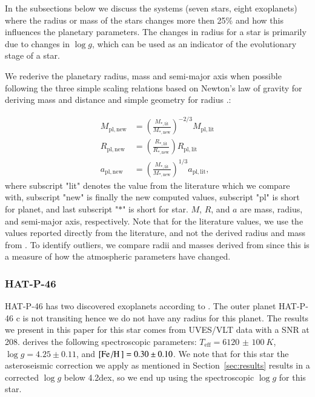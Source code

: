 \documentclass{aa}
\begin{document}
In the subsections below we discuss the systems (seven stars, eight exoplanets)
where the radius or mass of the stars changes more then 25\% and how this
influences the planetary parameters. The changes in radius for a star is
primarily due to changes in $\log g$, which can be used as an indicator of the
evolutionary stage of a star.

We rederive the planetary radius, mass and semi-major axis when possible
following the three simple scaling relations based on Newton's law of gravity
\citep{Newton1687} for deriving mass and distance and simple geometry for radius
\citep[see e.g.][]{Torres2008}.:

\begin{align}
    M_\mathrm{pl,new} &= \left(\frac{M_\mathrm{\ast,lit}}{M_\mathrm{\ast,new}}\right)^{-2/3} M_\mathrm{pl,lit}  \\
    R_\mathrm{pl,new} &= \left(\frac{R_\mathrm{\ast,lit}}{R_\mathrm{\ast,new}}\right) R_\mathrm{pl,lit} \\
    a_\mathrm{pl,new} &= \left(\frac{M_\mathrm{\ast,lit}}{M_\mathrm{\ast,new}}\right)^{1/3} a_\mathrm{pl,lit},
\end{align}
where subscript "lit" denotes the value from the literature which we compare
with, subscript "new" is finally the new computed values, subscript "pl" is
short for planet, and last subscript "$\ast$" is short for star. $M$, $R$, and
$a$ are mass, radius, and semi-major axis, respectively. Note that for the
literature values, we use the values reported directly from the literature, and
not the derived radius and mass from \citet{Torres2010}. To identify outliers,
we compare radii and masses derived from \citet{Torres2010} since this is a
measure of how the atmospheric parameters have changed.

\subsubsection{HAT-P-46}
\label{sub:HAT-P-46}
HAT-P-46 has two discovered exoplanets according to \citet{Hartmann2014}. The
outer planet HAT-P-46 c is not transiting hence we do not have any radius for
this planet. The results we present in this paper for this star comes from
UVES/VLT data with a SNR at 208. \citet{Hartmann2014} derives the following
spectroscopic parameters: $T_\mathrm{eff}=\SI{6120(100)}{K}$, $\log
g=4.25\pm0.11$, and $[\ion{Fe}/\ion{H}]=0.30\pm0.10$. We note that for this star
the asteroseismic correction we apply as mentioned in Section~\ref{sec:results}
results in a corrected $\log g$ below 4.2dex, so we end up using the
spectroscopic $\log g$ for this star.
\end{document}
